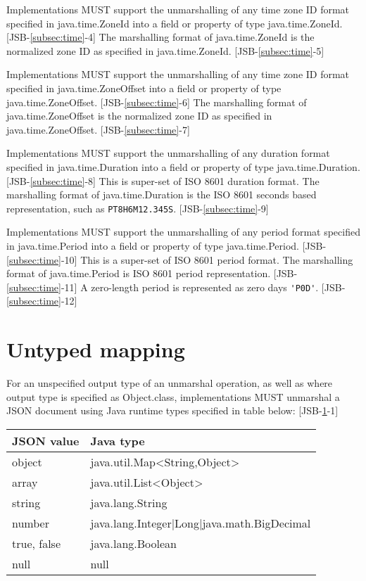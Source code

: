 Implementations MUST support the unmarshalling of any time zone ID format specified in java.time.ZoneId into a field or property of type java.time.ZoneId. [JSB-\ref{subsec:time}-4]
The marshalling format of java.time.ZoneId is the normalized zone ID as specified in java.time.ZoneId. [JSB-\ref{subsec:time}-5]

Implementations MUST support the unmarshalling of any time zone ID format specified in java.time.ZoneOffset into a field or property of type java.time.ZoneOffset. [JSB-\ref{subsec:time}-6]
The marshalling format of java.time.ZoneOffset is the normalized zone ID as specified in java.time.ZoneOffset. [JSB-\ref{subsec:time}-7]

Implementations MUST support the unmarshalling of any duration format specified in java.time.Duration into a field or property of type java.time.Duration. [JSB-\ref{subsec:time}-8] This is super-set of ISO 8601 duration format.
The marshalling format of java.time.Duration is the ISO 8601 seconds based representation, such as
\verb|PT8H6M12.345S|. [JSB-\ref{subsec:time}-9]

Implementations MUST support the unmarshalling of any period format specified in java.time.Period into a field or property of type java.time.Period. [JSB-\ref{subsec:time}-10] 
This is a super-set of ISO 8601 period format.
The marshalling format of java.time.Period is ISO 8601 period representation. [JSB-\ref{subsec:time}-11] 
A zero-length period is represented as zero days \verb|'P0D'|. [JSB-\ref{subsec:time}-12]


\section{Untyped mapping}
\label{sec:untyped}
For an unspecified output type of an unmarshal operation, as well as where output type is specified as Object.class, implementations MUST unmarshal a JSON document using Java runtime types specified in table below: [JSB-\ref{sec:untyped}-1]

\begin{tabularx}{\textwidth}{ |X|X| }
\hline
JSON value & Java type \\ 
\hline
object & java.util.Map\textless String,Object\textgreater\\
array & java.util.List\textless Object\textgreater \\
string & java.lang.String \\
number & java.lang.Integer|Long|java.math.BigDecimal \\
true, false & java.lang.Boolean \\
null & null \\
\hline
\end{tabularx}

